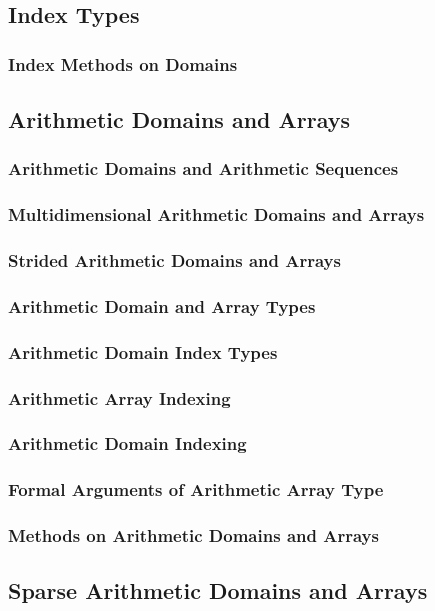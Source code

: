 \documentclass[10pt,twoside,titlepage]{article}
\begin{document}
\subsection{Index Types}
\subsubsection{Index Methods on Domains}
\subsection{Arithmetic Domains and Arrays}
\subsubsection{Arithmetic Domains and Arithmetic Sequences}
\subsubsection{Multidimensional Arithmetic Domains and Arrays}
\subsubsection{Strided Arithmetic Domains and Arrays}
\subsubsection{Arithmetic Domain and Array Types}
\subsubsection{Arithmetic Domain Index Types}
\subsubsection{Arithmetic Array Indexing}
\subsubsection{Arithmetic Domain Indexing}
\subsubsection{Formal Arguments of Arithmetic Array Type}
\subsubsection{Methods on Arithmetic Domains and Arrays}
\subsection{Sparse Arithmetic Domains and Arrays}
\end{document}
